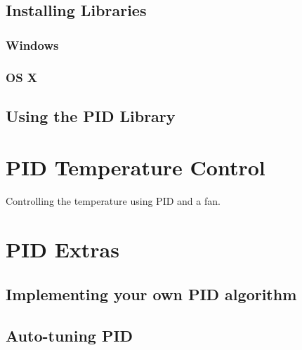 \documentclass[11pt,a4paper]{article}
\begin{document}
\subsection{Installing Libraries} %
\label{sub:installing_libraries}

\subsubsection{Windows} %
\label{ssub:windows_libraries}


\subsubsection{OS X} %
\label{ssub:os_x_libraries}



\subsection{Using the PID Library} %
\label{sub:using_the_pid_library}


\section{PID Temperature Control} %
\label{sec:pid_temperature_control}

Controlling the temperature using PID and a fan.


\section{PID Extras} %
\label{sec:pid_extras}

\subsection{Implementing your own PID algorithm} %
\label{sub:implementing_your_own_pid_algorithm}

\subsection{Auto-tuning PID} %
\label{sub:auto-tuning_pid}
\end{document}
